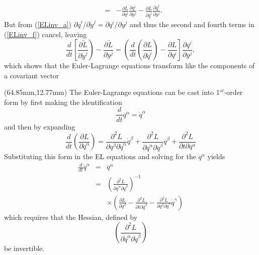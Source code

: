 \begin{textblock*}{65mm}
\begin{eqnarray}
    & = & - \frac{\partial L}{\partial q^i}        \frac{\partial q^i}{\partial y^j} 
	      - \frac{\partial L}{\partial {\dot q}^i} \frac{\partial {\dot q}^i}{\partial y^j} .\nonumber
\end{eqnarray}
But from (\ref{ELinv_a}) $ {\partial {\dot q}^i}/{\partial {\dot y}^j} = {\partial q^i}/{\partial y^j}$ and thus the second and
fourth terms in (\ref{ELinv_f}) cancel, leaving
\begin{equation}\label{ELinv_g}
  \frac{d}{dt} \left[ \frac{\partial \tilde L}{\partial {\dot y}^j } \right) - \frac{\partial \tilde L}{\partial y^j} = 
  \left( \frac{d}{d t} \left( \frac{\partial L}{\partial {\dot q}^i} \right) - \frac{\partial L}{\partial q^i} \right] 
  \frac{\partial q^i}{\partial y^j} ,
\end{equation}
which shows that the Euler-Lagrange equations transform like the components of a covariant vector
\end{textblock*}



\begin{textblock*}{65mm}(64.85mm,12.77mm)
The Euler-Lagrange equations can be cast into 1$^{st}$-order form by first making the identification
\[
  \frac{d}{d t} q^{\alpha} = {\dot q}^{\alpha}
\]
and then by expanding
\[
  \frac{d}{dt} \left( \frac{\partial L}{\partial {\dot q}^{\alpha}} \right) = 
    \frac{\partial^2 L}{\partial q^{\beta} \partial {\dot q}^{\alpha}} {\dot q}^{\beta} + 
	\frac{\partial^2 L}{\partial {\dot q}^{\alpha} \partial {\dot q}^{\beta}} {\ddot q^{\beta}}         +
	\frac{\partial^2 L}{\partial t \partial q^{\alpha}}                 
\]
Substituting this form in the EL equations and solving for the ${\ddot q}^{\alpha}$ yields
\begin{eqnarray*}
  \frac{d}{dt} {\dot q}^{\alpha} & = & {\ddot q}^{\alpha} \\ 
                                 & = & \left( \frac{\partial^2 L}{\partial {\dot q}^{\alpha} \partial {\dot q}^{\beta}} \right)^{-1} \\
								 &   & \times \left( \frac{\partial L}  {\partial q^{\beta}}                    -
							                         \frac{\partial^2 L}{\partial t \partial {\dot q}^{\beta}}  - 
									                 \frac{\partial^2 L}{\partial q^{\beta} \partial {\dot q}^{\gamma}} {\dot q}^{\gamma} 
									   \right)										  
\end{eqnarray*}
which requires that the Hessian, defined by
\[
  \left( \frac{\partial^2 L}{\partial {\dot q}^{\alpha} \partial {\dot q}^{\beta}} \right)
\]
be invertible.
\end{textblock*}
\newpage